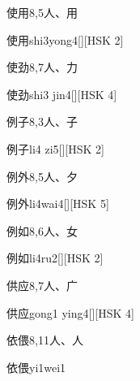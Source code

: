 \begin{entry}{使用}{8,5}{⼈、⽤}
  \begin{phonetics}{使用}{shi3yong4}[][HSK 2]
  \end{phonetics}
\end{entry}

\begin{entry}{使劲}{8,7}{⼈、⼒}
  \begin{phonetics}{使劲}{shi3 jin4}[][HSK 4]
  \end{phonetics}
\end{entry}

\begin{entry}{例子}{8,3}{⼈、⼦}
  \begin{phonetics}{例子}{li4 zi5}[][HSK 2]
  \end{phonetics}
\end{entry}

\begin{entry}{例外}{8,5}{⼈、⼣}
  \begin{phonetics}{例外}{li4wai4}[][HSK 5]
  \end{phonetics}
\end{entry}

\begin{entry}{例如}{8,6}{⼈、⼥}
  \begin{phonetics}{例如}{li4ru2}[][HSK 2]
  \end{phonetics}
\end{entry}

\begin{entry}{供应}{8,7}{⼈、⼴}
  \begin{phonetics}{供应}{gong1 ying4}[][HSK 4]
  \end{phonetics}
\end{entry}

\begin{entry}{依偎}{8,11}{⼈、⼈}
  \begin{phonetics}{依偎}{yi1wei1}
  \end{phonetics}
\end{entry}

